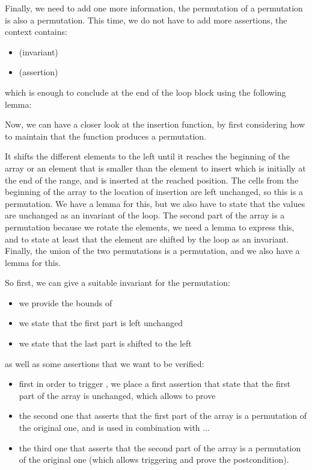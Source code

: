 Finally, we need to add one more information, the permutation of a permutation
is also a permutation. This time, we do not have to add more assertions, the
context contains:
\begin{itemize}
\item {} (invariant)
\item {} (assertion)
\end{itemize}
which is enough to conclude 
at the end of the loop block using the following lemma:






Now, we can have a closer look at the insertion function, by first considering
how to maintain that the function produces a permutation.




It shifts the different elements to the left until it reaches the beginning of
the array or an element that is smaller than the element to insert which is
initially at the end of the range, and is inserted at the reached position. The
cells from the beginning of the array to the location of insertion are left
unchanged, so this is a permutation. We have a lemma for this, but we also have
to state that the values are unchanged as an invariant of the loop. The second
part of the array is a permutation because we rotate the elements, we need a
lemma to express this, and to state at least that the element are shifted by the
loop as an invariant. Finally, the union of the two permutations is a
permutation, and we also have a lemma for this.



So first, we can give a suitable invariant for the permutation:
\begin{itemize}
\item we provide the bounds of 
\item we state that the first part is left unchanged
\item we state that the last part is shifted to the left
\end{itemize}
as well as some assertions that we want to be verified:
\begin{itemize}
\item first in order to trigger , we place
  a first assertion that state that the first part of the array is unchanged,
  which allows to prove
\item the second one that asserts that the first part of the array is a
  permutation of the original one, and is used in combination  with ...
\item the third one that asserts that the second part of the array is a
  permutation of the original one (which allows triggering
   and prove the postcondition).
\end{itemize}


